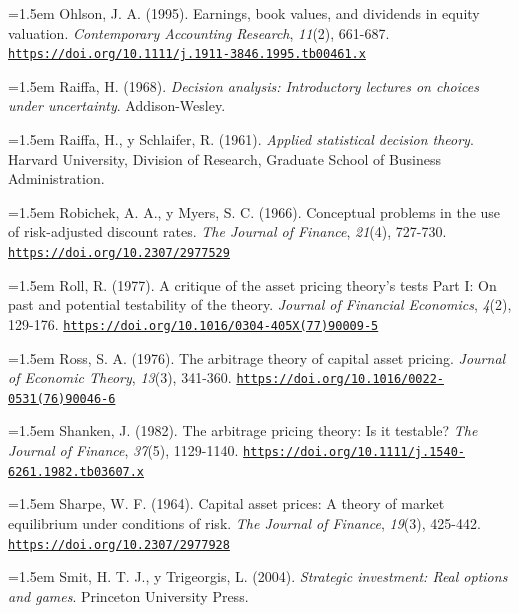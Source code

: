 \documentclass[10pt,a4paper]{article}
\begin{document}
\noindent\hangindent=1.5em Ohlson, J. A. (1995). Earnings, book values, and dividends in equity valuation. \textit{Contemporary Accounting Research}, \textit{11}(2), 661-687. \href{https://doi.org/10.1111/j.1911-3846.1995.tb00461.x}{\nolinkurl{https://doi.org/10.1111/j.1911-3846.1995.tb00461.x}}

\noindent\hangindent=1.5em Raiffa, H. (1968). \textit{Decision analysis: Introductory lectures on choices under uncertainty}. Addison-Wesley.

\noindent\hangindent=1.5em Raiffa, H., y Schlaifer, R. (1961). \textit{Applied statistical decision theory}. Harvard University, Division of Research, Graduate School of Business Administration.

\noindent\hangindent=1.5em Robichek, A. A., y Myers, S. C. (1966). Conceptual problems in the use of risk-adjusted discount rates. \textit{The Journal of Finance}, \textit{21}(4), 727-730. \href{https://doi.org/10.2307/2977529}{\nolinkurl{https://doi.org/10.2307/2977529}}

\noindent\hangindent=1.5em Roll, R. (1977). A critique of the asset pricing theory's tests Part I: On past and potential testability of the theory. \textit{Journal of Financial Economics}, \textit{4}(2), 129-176. \href{https://doi.org/10.1016/0304-405X(77)90009-5}{\nolinkurl{https://doi.org/10.1016/0304-405X(77)90009-5}}

\noindent\hangindent=1.5em Ross, S. A. (1976). The arbitrage theory of capital asset pricing. \textit{Journal of Economic Theory}, \textit{13}(3), 341-360. \href{https://doi.org/10.1016/0022-0531(76)90046-6}{\nolinkurl{https://doi.org/10.1016/0022-0531(76)90046-6}}

\noindent\hangindent=1.5em Shanken, J. (1982). The arbitrage pricing theory: Is it testable? \textit{The Journal of Finance}, \textit{37}(5), 1129-1140. \href{https://doi.org/10.1111/j.1540-6261.1982.tb03607.x}{\nolinkurl{https://doi.org/10.1111/j.1540-6261.1982.tb03607.x}}

\noindent\hangindent=1.5em Sharpe, W. F. (1964). Capital asset prices: A theory of market equilibrium under conditions of risk. \textit{The Journal of Finance}, \textit{19}(3), 425-442. \href{https://doi.org/10.2307/2977928}{\nolinkurl{https://doi.org/10.2307/2977928}}

\noindent\hangindent=1.5em Smit, H. T. J., y Trigeorgis, L. (2004). \textit{Strategic investment: Real options and games}. Princeton University Press.
\end{document}
